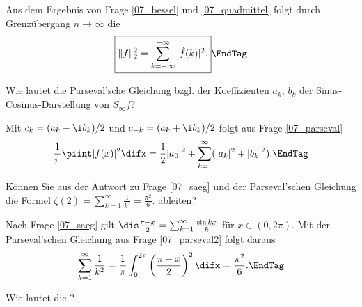  \begin{antwort}
    Aus dem Ergebnis von Frage \ref{07_bessel} und 
    \ref{07_quadmittel} folgt durch Grenzübergang 
    $n\to\infty$ die 
    \begin{equation}\label{parseval}
      \boxed{
        \|f\|_2^2 = \sum_{k=-\infty}^{+\infty} |\hat{f}(k)|^2.
      } \EndTag
    \end{equation}
  \end{antwort}

  \begin{frage}\label{07_parseval2}
    Wie lautet die Parseval'sche Gleichung bzgl. der Koeffizienten 
    $a_k$, $b_k$ der Sinus-Cosinus-Darstellung von $S_\infty f$?
  \end{frage}

  \begin{antwort}
    Mit $c_k=(a_k-\i b_k)/2$ und $c_{-k}=(a_k+\i b_k)/2$ folgt aus Frage 
    \ref{07_parseval}
    \begin{equation}
      \frac{1}{\pi}\piint |f(x)|^2 \difx 
      =\frac{1}{2}|a_0|^2+\sum_{k=1}^{\infty}(|a_k|^2+|b_k|^2).\EndTag
    \end{equation}
  \end{antwort}

  \begin{frage}
    Können Sie aus der Antwort zu Frage \ref{07_saeg}
    und der Parseval'schen Gleichung die 
    Formel $\zeta(2)=\sum_{k=1}^{\infty}\frac{1}{k^2}=\frac{\pi^2}{6}$. 
    ableiten?
  \end{frage}

  \begin{antwort}
    Nach Frage \ref{07_saeg} gilt 
    $\dis \frac{\pi -x }{2} = \sum_{k=1}^{\infty} \frac{\sin kx}{k}$ 
    für $x\in(0,2\pi)$. 
    Mit der Parseval'schen Gleichung aus Frage \ref{07_parseval2}
    folgt daraus 
    \begin{equation}
      \sum_{k=1}^{\infty}\frac{1}{k^2} =
      \frac{1}{\pi}\int_0^{2\pi} \left( \frac{\pi-x}{2} \right)^2 \difx
      =\frac{\pi^2}{6}.\EndTag
    \end{equation}
  \end{antwort}

  \begin{frage}
    Wie lautet die ?
  \end{frage}

